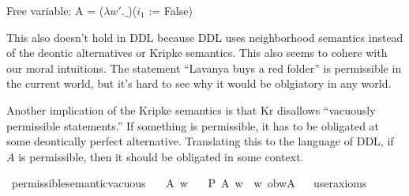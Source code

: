 \begin{isabellebody}
{  Free variable:
    A = ($\lambda w'. \_$)($i_1$ := False) \color{black}%
}%
\endisatagproof
{\isafoldproof}%
%
\isadelimproof
%
\endisadelimproof
%
\begin{isamarkuptext}%
This also doesn't hold in DDL because DDL uses neighborhood semantics instead of the deontic 
alternatives or Kripke semantics. This also seems to cohere with our moral intuitions. The statement 
``Lavanya buys a red folder'' is permissible in the current world, but it's hard to see why it would 
be oblgiatory in any world.

Another implication of the Kripke semantics is that Kr disallows ``vacuously permissible statements.'' If 
something is permissible, it has to be obligated at some deontically perfect alternative. 
Translating this to the language of DDL, if $A$ is permissible, then it should be obligated in some 
context.%
\end{isamarkuptext}\isamarkuptrue%
\isamarkupfalse%
\ permissible{\isacharunderscore}semantic{\isacharunderscore}vacuous{\isacharcolon}\isanewline
\ \ \ A\ w\isanewline
\ \ \ {\isachardoublequoteopen}P\ {\isacharbraceleft}A{\isacharbraceright}\ w\ {\isasymlongrightarrow}\ {\isacharparenleft}{\isasymexists}w{\isacharprime}{\isachardot}\ ob{\isacharparenleft}w{\isacharprime}{\isacharparenright}{\isacharparenleft}A{\isacharparenright}{\isacharparenright}{\isachardoublequoteclose}\isanewline
\ \ \isamarkupfalse%
{\isacharbrackleft}user{\isacharunderscore}axioms{\isacharbrackright}%
\isadelimproof
\ %
\endisadelimproof
%
\isatagproof
{}\isamarkupfalse%
\isanewline
%
\end{isabellebody}
